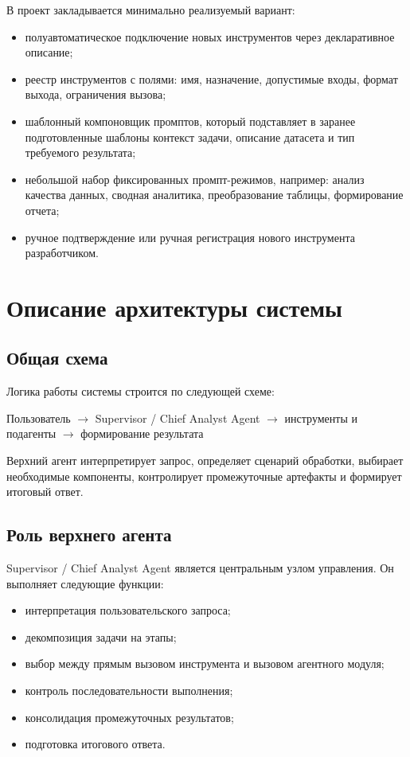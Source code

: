 \documentclass[14pt,a4paper]{extarticle}
\begin{document}
В проект закладывается минимально реализуемый вариант:
\begin{itemize}
    \item полуавтоматическое подключение новых инструментов через декларативное описание;
    \item реестр инструментов с полями: имя, назначение, допустимые входы, формат выхода, ограничения вызова;
    \item шаблонный компоновщик промптов, который подставляет в заранее подготовленные шаблоны контекст задачи, описание датасета и тип требуемого результата;
    \item небольшой набор фиксированных промпт-режимов, например: анализ качества данных, сводная аналитика, преобразование таблицы, формирование отчета;
    \item ручное подтверждение или ручная регистрация нового инструмента разработчиком.
\end{itemize}

\section{Описание архитектуры системы}

\subsection{Общая схема}

Логика работы системы строится по следующей схеме:
\begin{center}
\parbox{0.95\textwidth}{\centering Пользователь $\rightarrow$ Supervisor / Chief Analyst Agent $\rightarrow$ инструменты и подагенты $\rightarrow$ формирование результата}
\end{center}

Верхний агент интерпретирует запрос, определяет сценарий обработки, выбирает необходимые компоненты, контролирует промежуточные артефакты и формирует итоговый ответ.

\subsection{Роль верхнего агента}

Supervisor / Chief Analyst Agent является центральным узлом управления. Он выполняет следующие функции:
\begin{itemize}
    \item интерпретация пользовательского запроса;
    \item декомпозиция задачи на этапы;
    \item выбор между прямым вызовом инструмента и вызовом агентного модуля;
    \item контроль последовательности выполнения;
    \item консолидация промежуточных результатов;
    \item подготовка итогового ответа.
\end{itemize}
\end{document}

